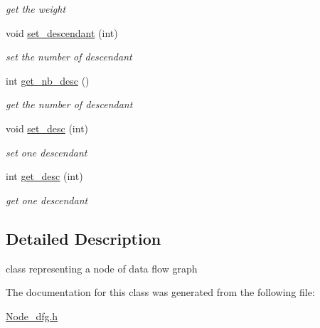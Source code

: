 \begin{DoxyCompactItemize}
\begin{DoxyCompactList}\small\item\em get the weight \item\end{DoxyCompactList}\item 
\hypertarget{classNode__dfg_a37d72db9e82eb9bb52247069fe358cfe}{
void \hyperlink{classNode__dfg_a37d72db9e82eb9bb52247069fe358cfe}{set\_\-descendant} (int)}
\label{classNode__dfg_a37d72db9e82eb9bb52247069fe358cfe}

\begin{DoxyCompactList}\small\item\em set the number of descendant \item\end{DoxyCompactList}\item 
\hypertarget{classNode__dfg_a8001932f560722545c64e17ae8a37dca}{
int \hyperlink{classNode__dfg_a8001932f560722545c64e17ae8a37dca}{get\_\-nb\_\-desc} ()}
\label{classNode__dfg_a8001932f560722545c64e17ae8a37dca}

\begin{DoxyCompactList}\small\item\em get the number of descendant \item\end{DoxyCompactList}\item 
\hypertarget{classNode__dfg_a6d7e50cba649aad4a27e802660778f82}{
void \hyperlink{classNode__dfg_a6d7e50cba649aad4a27e802660778f82}{set\_\-desc} (int)}
\label{classNode__dfg_a6d7e50cba649aad4a27e802660778f82}

\begin{DoxyCompactList}\small\item\em set one descendant \item\end{DoxyCompactList}\item 
\hypertarget{classNode__dfg_adb01eca7498fbdd4f3d2d123e2212ea6}{
int \hyperlink{classNode__dfg_adb01eca7498fbdd4f3d2d123e2212ea6}{get\_\-desc} (int)}
\label{classNode__dfg_adb01eca7498fbdd4f3d2d123e2212ea6}

\begin{DoxyCompactList}\small\item\em get one descendant \item\end{DoxyCompactList}\end{DoxyCompactItemize}


\subsection{Detailed Description}
class representing a node of data flow graph 

The documentation for this class was generated from the following file:\begin{DoxyCompactItemize}
\item 
\hyperlink{Node__dfg_8h}{Node\_\-dfg.h}\end{DoxyCompactItemize}
